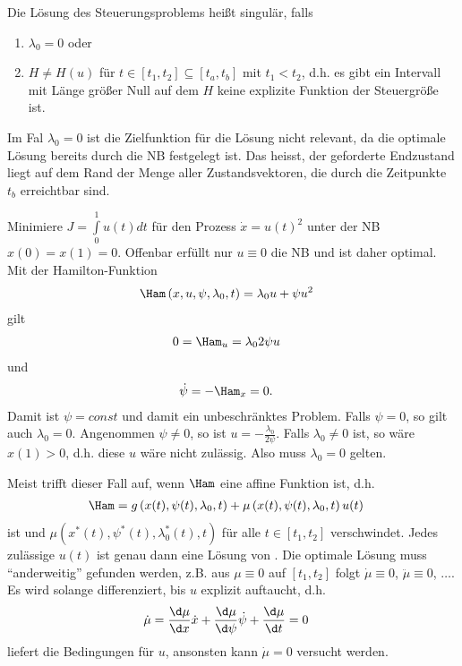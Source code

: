 \begin{defi}
Die Lösung des Steuerungsproblems heißt singulär, falls
\begin{enumerate}[label=(\Roman*)]
  \item $\lambda_0=0$ oder
  \item $H\neq H(u)$ für $t\in[t_1,t_2]\subseteq[t_a,t_b]$ mit $t_1<t_2$, d.h. es gibt ein Intervall mit Länge größer Null auf dem $H$ keine
  explizite Funktion der Steuergröße ist.
\end{enumerate}
\end{defi}

\begin{remark}
Im Fal $\lambda_0=0$ ist die Zielfunktion für die Lösung nicht relevant, da die optimale Lösung bereits durch die \ac{NB} festgelegt ist. Das heisst,
der geforderte Endzustand liegt auf dem Rand der Menge aller Zustandsvektoren, die durch die Zeitpunkte $t_b$ erreichtbar sind. 
\end{remark}

\begin{exmp}
Minimiere $J = \int\limits_0^1 u(t)dt$ für den Prozess $\dot{x}=u(t)^2$ unter der \ac{NB} $x(0)=x(1)=0$. Offenbar erfüllt nur $u\equiv 0$ die \ac{NB}
und ist daher optimal. Mit der Hamilton-Funktion
\begin{align*}
	\Ham\left(x,u,\psi,\lambda_0,t \right) & = \lambda_0u + \psi u^2
\end{align*}
gilt
\begin{align*}
	0 & = \Ham_u = \lambda_0 2\psi u
\end{align*}
und
\begin{align*}
	\dot{\psi}& = -\Ham_x=0.
\end{align*} 
Damit ist $\psi=const$ und damit ein unbeschränktes Problem. Falls $\psi = 0$, so gilt auch $\lambda_0=0$. Angenommen $\psi\neq 0$, so ist
$u=-\frac{\lambda_0}{2\psi}$. Falls $\lambda_0\neq 0$ ist, so wäre $x(1)>0$, d.h. diese $u$ wäre nicht zulässig. Also muss $\lambda_0=0$ gelten.
\end{exmp}

\begin{remark}
Meist trifft dieser Fall auf, wenn $\Ham$ eine affine Funktion ist, d.h. 
\begin{align*}
	\Ham & = g\left(x(t),\psi(t),\lambda_0,t \right) + \mu\left(x(t),\psi(t),\lambda_0,t \right)u(t)
\end{align*}
ist und $\mu\left(x^{\ast}(t),\psi^{\ast}(t),\lambda_0^{\ast}(t),t \right)$ für alle $t\in[t_1,t_2]$ verschwindet. Jedes zulässige $u(t)$ ist genau
dann eine Lösung von . Die optimale Lösung muss "`anderweitig"' gefunden werden, z.B. aus $\mu\equiv 0$ auf
$[t_1,t_2]$ folgt $\dot{\mu}\equiv 0$, $\ddot{\mu}\equiv 0$, $\ldots$. Es wird solange differenziert, bis $u$ explizit auftaucht, d.h. 
\begin{align*}
	\dot{\mu} & = \frac{\d \mu}{\d x}\dot{x}+\frac{\d \mu}{\d \psi}\dot{\psi}+\frac{\d\mu}{\d t} = 0
\end{align*}
liefert die Bedingungen für $u$, ansonsten kann $\dot{\mu}=0$ versucht werden.
\end{remark}

